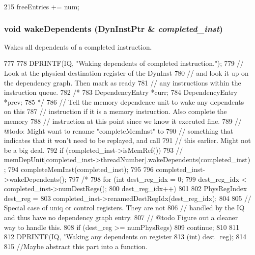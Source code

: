 \begin{DoxyCode}
215 { freeEntries += num; }
\end{DoxyCode}
\hypertarget{classInstQueue_ab9afe94d332a563b9485d1bb9acd68b4}{
\subsubsection[{wakeDependents}]{\setlength{\rightskip}{0pt plus 5cm}void wakeDependents ({\bf DynInstPtr} \& {\em completed\_\-inst})}}
\label{classInstQueue_ab9afe94d332a563b9485d1bb9acd68b4}
Wakes all dependents of a completed instruction. 


\begin{DoxyCode}
777 {
778     DPRINTF(IQ, "Waking dependents of completed instruction.\n");
779     // Look at the physical destination register of the DynInst
780     // and look it up on the dependency graph.  Then mark as ready
781     // any instructions within the instruction queue.
782 /*
783     DependencyEntry *curr;
784     DependencyEntry *prev;
785 */
786     // Tell the memory dependence unit to wake any dependents on this
787     // instruction if it is a memory instruction.  Also complete the memory
788     // instruction at this point since we know it executed fine.
789     // @todo: Might want to rename "completeMemInst" to
790     // something that indicates that it won't need to be replayed, and call
791     // this earlier.  Might not be a big deal.
792     if (completed_inst->isMemRef()) {
793 //        memDepUnit[completed_inst->threadNumber].wakeDependents(completed_inst)
      ;
794         completeMemInst(completed_inst);
795     }
796     completed_inst->wakeDependents();
797 /*
798     for (int dest_reg_idx = 0;
799          dest_reg_idx < completed_inst->numDestRegs();
800          dest_reg_idx++)
801     {
802         PhysRegIndex dest_reg =
803             completed_inst->renamedDestRegIdx(dest_reg_idx);
804 
805         // Special case of uniq or control registers.  They are not
806         // handled by the IQ and thus have no dependency graph entry.
807         // @todo Figure out a cleaner way to handle this.
808         if (dest_reg >= numPhysRegs) {
809             continue;
810         }
811 
812         DPRINTF(IQ, "Waking any dependents on register %
813                 (int) dest_reg);
814 
815         //Maybe abstract this part into a function.
}}
\end{DoxyCode}
